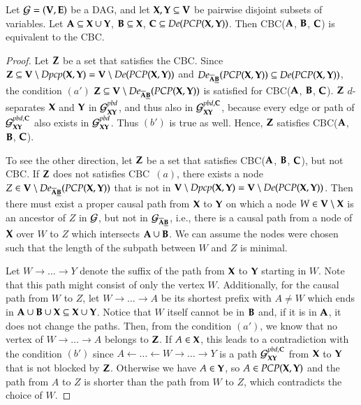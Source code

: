\begin{lemma}\label{lem:cbc:variants}
Let ${\cal G} = ({\bf V},{\bf E})$ be a DAG, and 
let ${\bf X},{\bf Y}\subseteq {\bf V}$ be pairwise disjoint subsets of variables. 
Let ${\bf A} \subseteq {\bf X} \cup {\bf Y} $, ${\bf B} \subseteq {\bf X} $, ${\bf C} \subseteq \textit{De}(\textit{PCP}({\bf X},{\bf Y}))$. Then CBC(${\bf A}$, ${\bf B}$, ${\bf C} $) is equivalent to the CBC.
\end{lemma}
\begin{proof}
Let $ {\bf Z} $ be a set that satisfies the CBC. 
Since $ {\bf Z} \subseteq {\bf V} \setminus \textit{Dpcp}({\bf X},{\bf Y}) = {\bf V} \setminus \textit{De}(\textit{PCP}({\bf X},{\bf Y})) $ and 
$ De_{\overline{{\bf A}}\underline{{\bf B}}}(\textit{PCP}({\bf X},{\bf Y})) \subseteq \textit{De}(\textit{PCP}({\bf X},{\bf Y}))$, 
the condition $(a')$   $ {\bf Z} \subseteq {\bf V} \setminus De_{\overline{{\bf A}}\underline{{\bf B}}}(\textit{PCP}({\bf X},{\bf Y})) $ 
is satisfied for CBC(${\bf A}$, ${\bf B}$, ${\bf C} $). 
$ {\bf Z} $ $ d $-separates $ {\bf X} $ and $ {\bf Y} $ in $ {\cal G}^{pbd}_{{\bf X}{\bf Y}} $, and thus also in $ {\cal G}^{pbd,{\bf C}}_{{\bf X}{\bf Y}} $, 
because every edge or path of $ {\cal G}^{pbd,{\bf C}}_{{\bf X}{\bf Y}} $ also exists in $ {\cal G}^{pbd}_{{\bf X}{\bf Y}} $. Thus $(b')$ is true as well. 
Hence, $ {\bf Z} $ satisfies CBC(${\bf A}$, ${\bf B}$, ${\bf C} $). 

To see the other direction, let $ {\bf Z} $ be a set that satisfies CBC(${\bf A}$, ${\bf B}$, ${\bf C} $), but not CBC. 
If $ {\bf Z} $ does not satisfies CBC~$(a)$, there exists a node $ Z\in{\bf V} \setminus De_{\overline{{\bf A}}\underline{{\bf B}}}(\textit{PCP}({\bf X},{\bf Y}))$ that is not in $ {\bf V} \setminus \textit{Dpcp}({\bf X},{\bf Y}) = {\bf V} \setminus \textit{De}(\textit{PCP}({\bf X},{\bf Y}))  $.
Then there must exist a proper causal path from ${\bf X}$ to ${\bf Y}$ on which a node $W \in {\bf V} \setminus {\bf X}$ is an ancestor of $ Z $ in $ {\cal G} $, but not in $ {\cal G}_{\overline{{\bf A}}\underline{{\bf B}}} $, i.e., there is a causal path from a node of $ {\bf X}  $ over $W$ to $Z$ which intersects ${\bf A} \cup {\bf B}	$. We can assume the nodes were chosen such that the length of the subpath between $ W $ and $ Z $ is minimal.
 
Let $W \to \ldots \to Y$ denote the suffix of the path from ${\bf X}$ to ${\bf Y}$ 
starting in $W$. Note that this path might consist of only the vertex $W$.
Additionally, for the causal path from $W$ to $Z$, let $W \to \ldots \to A$ 
be its shortest prefix with $ A \neq W $ which ends in ${\bf A}\cup{\bf B}\cup{\bf X} \subseteq {\bf X} \cup {\bf Y}$. 
Notice that $W$ itself cannot be in $ {\bf B}$ and, if it is in ${\bf A}$, it does not change the paths.
Then, from the condition $(a')$, we know that no vertex of $W \to \ldots \to A$ belongs to ${\bf Z}$. 
If $A \in {\bf X}$, this leads to  a contradiction with the condition $(b')$ since 
$A \gets \ldots \gets W \to \ldots \to Y$ is a path $ {\cal G}^{pbd,{\bf C}}_{{\bf X}{\bf Y}} $ from ${\bf X}$ to ${\bf Y}$ that is not blocked by ${\bf Z}$. %
Otherwise we have $A \in {\bf Y}$, so $A \in \textit{PCP}({\bf X},{\bf Y})$ and the path from $A$ to $ Z $ is shorter than the path from $ W $ to $ Z $, which contradicts the choice of $ W $.  


\end{proof}

